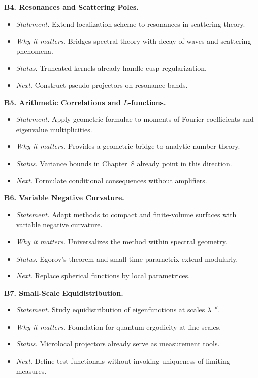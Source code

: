 \medskip
\noindent\textbf{B4. Resonances and Scattering Poles.}
\begin{itemize}
  \item \emph{Statement.} Extend localization scheme to resonances in scattering theory.
  \item \emph{Why it matters.} Bridges spectral theory with decay of waves and scattering phenomena.
  \item \emph{Status.} Truncated kernels already handle cusp regularization.
  \item \emph{Next.} Construct pseudo-projectors on resonance bands.
\end{itemize}

\medskip
\noindent\textbf{B5. Arithmetic Correlations and $L$-functions.}
\begin{itemize}
  \item \emph{Statement.} Apply geometric formulae to moments of Fourier coefficients and eigenvalue multiplicities.
  \item \emph{Why it matters.} Provides a geometric bridge to analytic number theory.
  \item \emph{Status.} Variance bounds in Chapter~8 already point in this direction.
  \item \emph{Next.} Formulate conditional consequences without amplifiers.
\end{itemize}

\medskip
\noindent\textbf{B6. Variable Negative Curvature.}
\begin{itemize}
  \item \emph{Statement.} Adapt methods to compact and finite-volume surfaces with variable negative curvature.
  \item \emph{Why it matters.} Universalizes the method within spectral geometry.
  \item \emph{Status.} Egorov’s theorem and small-time parametrix extend modularly.
  \item \emph{Next.} Replace spherical functions by local parametrices.
\end{itemize}

\medskip
\noindent\textbf{B7. Small-Scale Equidistribution.}
\begin{itemize}
  \item \emph{Statement.} Study equidistribution of eigenfunctions at scales $\lambda^{-\theta}$.
  \item \emph{Why it matters.} Foundation for quantum ergodicity at fine scales.
  \item \emph{Status.} Microlocal projectors already serve as measurement tools.
  \item \emph{Next.} Define test functionals without invoking uniqueness of limiting measures.
\end{itemize}

